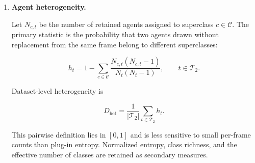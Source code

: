 \begin{enumerate}
\item \textbf{Agent heterogeneity.}

Let \(N_{c,t}\) be the number of retained agents assigned to superclass
\(c\in\mathcal C\). The primary statistic is the probability that two
agents drawn without replacement from the same frame belong to
different superclasses:

\[
h_t
=
1-
\sum_{c\in\mathcal C}
\frac{
N_{c,t}(N_{c,t}-1)
}{
N_t(N_t-1)
},
\qquad
t\in\mathcal T_2.
\]

Dataset-level heterogeneity is

\[
D_{\mathrm{het}}
=
\frac{1}{|\mathcal T_2|}
\sum_{t\in\mathcal T_2}h_t.
\]

This pairwise definition lies in \([0,1]\) and is less sensitive to
small per-frame counts than plug-in entropy. Normalized entropy, class
richness, and the effective number of classes are retained as secondary
measures.

\end{enumerate}







